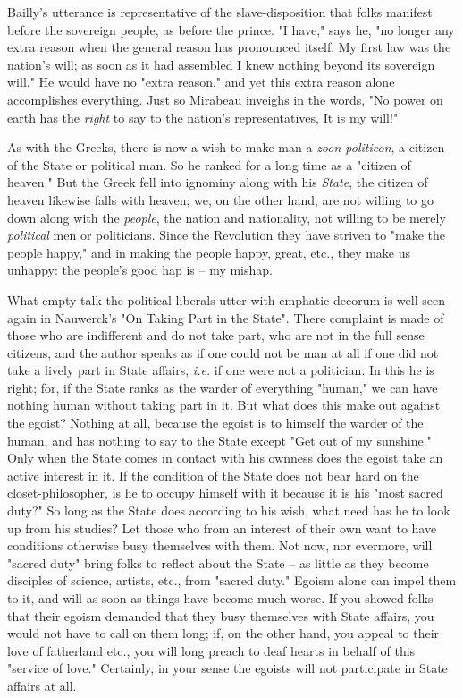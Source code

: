 Bailly's utterance is representative of the slave-disposition that folks 
manifest before the sovereign people, as before the prince. "{}I have,"{} says 
he, "{}no longer any extra reason when the general reason has pronounced 
itself. My first law was the nation's will; as soon as it had assembled I knew 
nothing beyond its sovereign will."{} He would have no "{}extra reason,"{} and 
yet this extra reason alone accomplishes everything. Just so Mirabeau inveighs 
in the words, "{}No power on earth has the \textit{right} to say to the 
nation's representatives, It is my will!"{}

As with the Greeks, there is now a wish to make man a \textit{zoon politicon}, 
a citizen of the State or political man. So he ranked for a long time as a 
"{}citizen of heaven."{} But the Greek fell into ignominy along with his 
\textit{State}, the citizen of heaven likewise falls with heaven; we, on the 
other hand, are not willing to go down along with the \textit{people}, the 
nation and nationality, not willing to be merely \textit{political} men or 
politicians. Since the Revolution they have striven to "{}make the people 
happy,"{} and in making the people happy, great, etc., they make us unhappy: 
the people's good hap is -- my mishap.

What empty talk the political liberals utter with emphatic decorum is well 
seen again in Nauwerck's "{}On Taking Part in the State"{}. There complaint is 
made of those who are indifferent and do not take part, who are not in the 
full sense citizens, and the author speaks as if one could not be man at all 
if one did not take a lively part in State affairs, \textit{i.e.} if one were 
not a politician. In this he is right; for, if the State ranks as the warder 
of everything "{}human,"{} we can have nothing human without taking part in 
it. But what does this make out against the egoist? Nothing at all, because 
the egoist is to himself the warder of the human, and has nothing to say to 
the State except "{}Get out of my sunshine."{} Only when the State comes in 
contact with his ownness does the egoist take an active interest in it. If the 
condition of the State does not bear hard on the closet-philosopher, is he to 
occupy himself with it because it is his "{}most sacred duty?"{} So long as 
the State does according to his wish, what need has he to look up from his 
studies? Let those who from an interest of their own want to have conditions 
otherwise busy themselves with them. Not now, nor evermore, will "{}sacred 
duty"{} bring folks to reflect about the State -- as little as they become 
disciples of science, artists, etc., from "{}sacred duty."{} Egoism alone can 
impel them to it, and will as soon as things have become much worse. If you 
showed folks that their egoism demanded that they busy themselves with State 
affairs, you would not have to call on them long; if, on the other hand, you 
appeal to their love of fatherland etc., you will long preach to deaf hearts 
in behalf of this "{}service of love."{} Certainly, in your sense the egoists 
will not participate in State affairs at all.


